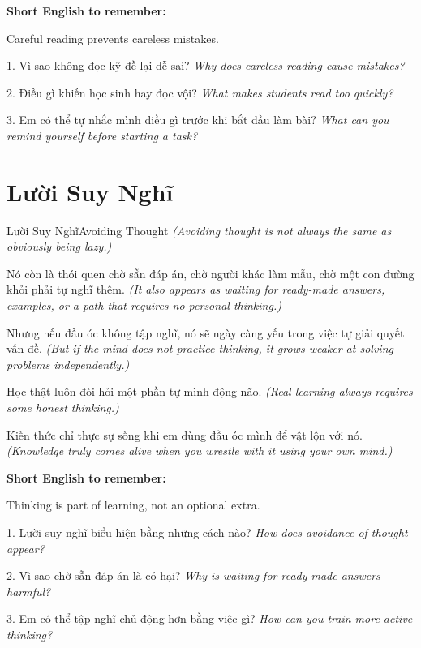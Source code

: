 \begin{ghinhoanh}
\textbf{Short English to remember:}

Careful reading prevents careless mistakes.

\end{ghinhoanh}

\begin{tuhocnhanh}
1. Vì sao không đọc kỹ đề lại dễ sai? \textit{Why does careless reading cause mistakes?}

2. Điều gì khiến học sinh hay đọc vội? \textit{What makes students read too quickly?}

3. Em có thể tự nhắc mình điều gì trước khi bắt đầu làm bài? \textit{What can you remind yourself before starting a task?}
\end{tuhocnhanh}
\ngancach

\section{Lười Suy Nghĩ}
\begin{truyen}{Lười Suy Nghĩ}{Avoiding Thought}
\textit{(Avoiding thought is not always the same as obviously being lazy.)}

Nó còn là thói quen chờ sẵn đáp án, chờ người khác làm mẫu, chờ một con đường khỏi phải tự nghĩ thêm.
\textit{(It also appears as waiting for ready-made answers, examples, or a path that requires no personal thinking.)}

Nhưng nếu đầu óc không tập nghĩ, nó sẽ ngày càng yếu trong việc tự giải quyết vấn đề.
\textit{(But if the mind does not practice thinking, it grows weaker at solving problems independently.)}

Học thật luôn đòi hỏi một phần tự mình động não.
\textit{(Real learning always requires some honest thinking.)}
\end{truyen}

\begin{baihoc}
Kiến thức chỉ thực sự sống khi em dùng đầu óc mình để vật lộn với nó.
\textit{(Knowledge truly comes alive when you wrestle with it using your own mind.)}
\end{baihoc}

\begin{ghinhoanh}
\textbf{Short English to remember:}

Thinking is part of learning, not an optional extra.

\end{ghinhoanh}

\begin{tuhocnhanh}
1. Lười suy nghĩ biểu hiện bằng những cách nào? \textit{How does avoidance of thought appear?}

2. Vì sao chờ sẵn đáp án là có hại? \textit{Why is waiting for ready-made answers harmful?}

3. Em có thể tập nghĩ chủ động hơn bằng việc gì? \textit{How can you train more active thinking?}
\end{tuhocnhanh}
\ngancach